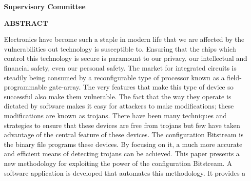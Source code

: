 \newpage
{}

\noindent \textbf{Supervisory Committee}
\tpbreak
\panel

\begin{center}
\textbf{ABSTRACT}
\end{center}

Electronics have become such a staple in modern life that we are affected by the vulnerabilities out technology is susceptible to.
Ensuring that the chips which control this technology is secure is paramount to our privacy, our intellectual and financial safety, even our personal safety.
The market for integrated circuits is steadily being consumed by a reconfigurable type of processor known as a field-programmable gate-array.
The very features that make this type of device so successful also make them vulnerable.
The fact that the way they operate is dictated by software makes it easy for attackers to make modifications; these modifications are known as trojans.
There have been many techniques and strategies to ensure that these devices are free from trojans but few have taken advantage of the central feature of these devices.
The configuration Bitstream is the binary file programs these devices.
By focusing on it, a much more accurate and efficient means of detecting trojans can be achieved.
This paper presents a new methodology for exploiting the power of the configuration Bitstream.
A software application is developed that automates this methodology.
It provides a
